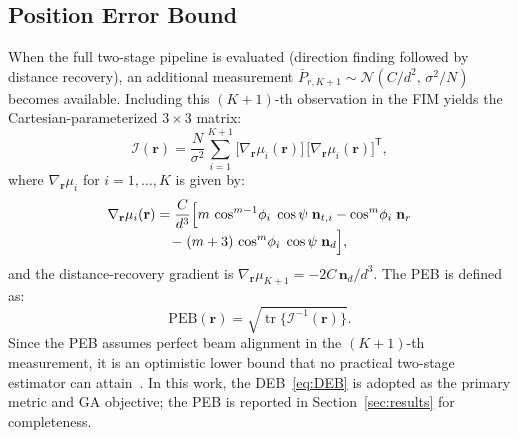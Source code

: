 \documentclass[journal]{IEEEtran}
\newcommand{\added}[1]{{\color{blue}#1}}
\begin{document}
\added{\subsection{Position Error Bound}
\label{subsec:PEB}
When the full two-stage pipeline is evaluated (direction finding followed by distance recovery), an additional measurement $\bar P_{r,K+1}\sim\mathcal{N}(C/d^2,\,\sigma^2/N)$ becomes available.  Including this $(K{+}1)$-th observation in the FIM yields the Cartesian-parameterized $3\times3$ matrix:
\begin{equation}
\mathcal{I}(\mathbf r)
= \frac{N}{\sigma^{2}}
  \sum_{i=1}^{K+1}
  \bigl[\nabla_{\mathbf r}\mu_i(\mathbf r)\bigr]\,
  \bigl[\nabla_{\mathbf r}\mu_i(\mathbf r)\bigr]^{\!\mathsf T},
\label{eq:FIM_general}
\end{equation}
where $\nabla_{\mathbf r}\mu_i$ for $i=1,\ldots,K$ is given by:
\begin{multline}
    \nabla_{\mathbf r}\mu_i(\mathbf r)
    = \frac{C}{d^{3}}
      \Bigl[
        m\,\cos^{m-1}\!\phi_i\;\cos\psi\;\mathbf n_{t,i}
        -
        \cos^{m}\!\phi_i\;\mathbf n_{r}
    \\[-3pt]
        -\;
        (m+3)\,\cos^{m}\!\phi_i\;\cos\psi\;\mathbf n_{d}
      \Bigr],
    \label{eq:grad_mu_closed}
\end{multline}
and the distance-recovery gradient is $\nabla_{\mathbf r}\mu_{K+1} = -2C\,\mathbf n_d/d^3$.  The PEB is defined as:
\begin{equation}
\mathrm{PEB}(\mathbf r)
= \sqrt{\operatorname{tr}\!\bigl\{\mathcal{I}^{-1}(\mathbf r)\bigr\}}.
\label{eq:PEB}
\end{equation}
Since the PEB assumes perfect beam alignment in the $(K{+}1)$-th measurement, it is an optimistic lower bound that no practical two-stage estimator can attain~\cite{Kay1993}.  In this work, the DEB~\eqref{eq:DEB} is adopted as the primary metric and GA objective; the PEB is reported in Section~\ref{sec:results} for completeness.}
\end{document}
